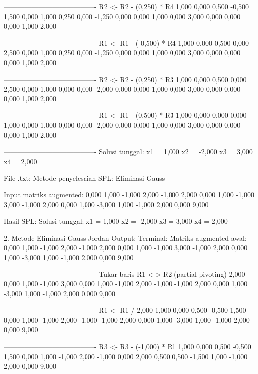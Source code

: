 \documentclass[12pt]{article}
\begin{document}
\begin{enumerate}
\begin{keluaran}
----------------------------------------
R2 <- R2 - (0,250) * R4
1,000   0,000   0,500   -0,500  1,500
0,000   1,000   0,250   0,000   -1,250
0,000   0,000   1,000   0,000   3,000
0,000   0,000   0,000   1,000   2,000

----------------------------------------
R1 <- R1 - (-0,500) * R4
1,000   0,000   0,500   0,000   2,500
0,000   1,000   0,250   0,000   -1,250
0,000   0,000   1,000   0,000   3,000
0,000   0,000   0,000   1,000   2,000

----------------------------------------
R2 <- R2 - (0,250) * R3
1,000   0,000   0,500   0,000   2,500
0,000   1,000   0,000   0,000   -2,000
0,000   0,000   1,000   0,000   3,000
0,000   0,000   0,000   1,000   2,000

----------------------------------------
R1 <- R1 - (0,500) * R3
1,000   0,000   0,000   0,000   1,000
0,000   1,000   0,000   0,000   -2,000
0,000   0,000   1,000   0,000   3,000
0,000   0,000   0,000   1,000   2,000

----------------------------------------
Solusi tunggal:
x1 = 1,000
x2 = -2,000
x3 = 3,000
x4 = 2,000

File .txt:
Metode penyelesaian SPL: Eliminasi Gauss

Input matriks augmented:
0,000	1,000	-1,000	2,000	-1,000
2,000	0,000	1,000	-1,000	3,000
-1,000	2,000	0,000	1,000	-3,000
1,000	-1,000	2,000	0,000	9,000

Hasil SPL:
Solusi tunggal:
x1 = 1,000
x2 = -2,000
x3 = 3,000
x4 = 2,000

2. Metode Eliminasi Gauss-Jordan
Output:
Terminal:
Matriks augmented awal:
0,000   1,000   -1,000  2,000   -1,000
2,000   0,000   1,000   -1,000  3,000
-1,000  2,000   0,000   1,000   -3,000
1,000   -1,000  2,000   0,000   9,000

----------------------------------------
Tukar baris R1 <-> R2 (partial pivoting)
2,000   0,000   1,000   -1,000  3,000
0,000   1,000   -1,000  2,000   -1,000
-1,000  2,000   0,000   1,000   -3,000
1,000   -1,000  2,000   0,000   9,000

----------------------------------------
R1 <- R1 / 2,000
1,000   0,000   0,500   -0,500  1,500
0,000   1,000   -1,000  2,000   -1,000
-1,000  2,000   0,000   1,000   -3,000
1,000   -1,000  2,000   0,000   9,000

----------------------------------------
R3 <- R3 - (-1,000) * R1
1,000   0,000   0,500   -0,500  1,500
0,000   1,000   -1,000  2,000   -1,000
0,000   2,000   0,500   0,500   -1,500
1,000   -1,000  2,000   0,000   9,000


\end{keluaran}
\end{enumerate}
\end{document}
